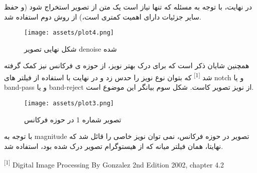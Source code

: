 \documentclass[a4paper,12pt]{article}
\begin{document}
در نهایت، با توجه به مسئله که تنها نیاز است یک متن از تصویر استخراج شود (و حفظ سایر جزئیات دارای اهمیت کمتری است،) از روش دوم استفاده شد.

\begin{figure}[h]
	\centering
	\texttt{[image: assets/plot4.png]}
	\caption{\textcolor{CustomAccent}{شکل نهایی تصویر denoise شده}}
\end{figure}

\pagebreak

همچنین شایان ذکر است که برای درک بهتر نویز، از حوزه ی فرکانس نیز کمک گرفته شد
 \textsuperscript{[1]}  که بتوان نوع نویز را حدس زد و در نهایت با استفاده از فیلتر های notch و یا band-pass و یا band-reject از نویز تصویر کاست. شکل سوم بیانگر این موضوع است.

\begin{figure}[h]
	\centering
	\texttt{[image: assets/plot3.png]}
	\caption{\textcolor{CustomAccent}{تصویر شماره 1 در حوزه فرکانس}}
\end{figure}

با توجه به magnitude تصویر در حوزه فرکانس، نمی توان نویز خاصی را قائل شد که نهایتا، همان فیلتر میانه که از هیستوگرام تصویر درک شده بود، استفاده شد.


\vfill
\hline
\begin{LTR}
	\begin{latin}
		\begin{center}
			\begin{minipage}{0.9\linewidth}
				\small %
				\textsuperscript{[1]} Digital Image Processing By Gonzalez 2nd Edition 2002, chapter 4.2
			\end{minipage}
		\end{center}
	\end{latin}
\end{LTR}
%
%
\end{document}
